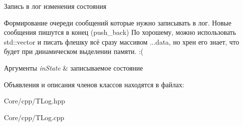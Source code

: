 Запись в лог изменения состояния 

Формирование очереди сообщений которые нужно записывать в лог. Новые сообщения пишутся в конец (push\+\_\+back) По хорошему, можно использовать std\+::vector и писать флешку всё сразу массивом ...data, но хрен его знает, что будет при динамическом выделении памяти. \+:( 
\begin{DoxyParams}{Аргументы}
{\em in\+State} & записываемое состояние \\
\hline
\end{DoxyParams}


Объявления и описания членов классов находятся в файлах\+:\begin{DoxyCompactItemize}
\item 
Core/cpp/T\+Log.\+hpp\item 
Core/cpp/T\+Log.\+cpp\end{DoxyCompactItemize}

